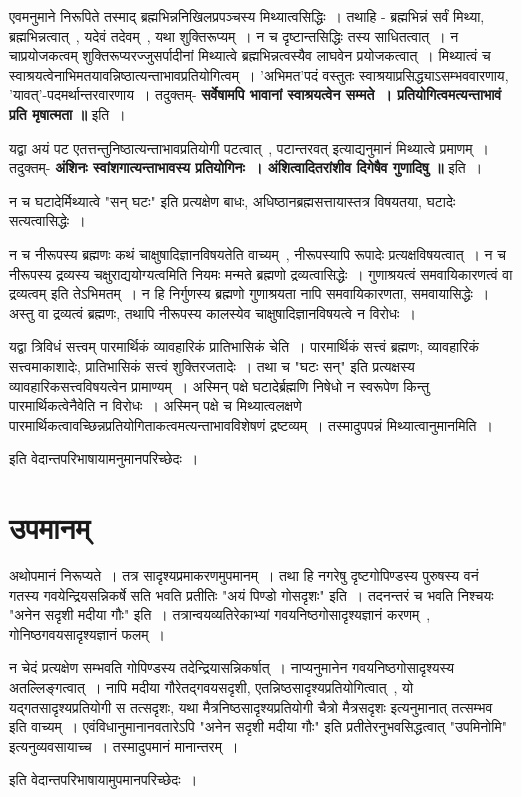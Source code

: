 	एवमनुमाने निरूपिते तस्माद् ब्रह्मभिन्ननिखिलप्रपञ्चस्य मिथ्यात्वसिद्धिः~। तथाहि - ब्रह्मभिन्नं सर्वं मिथ्या, ब्रह्मभिन्नत्वात्~, यदेवं तदेवम्~, यथा शुक्तिरूप्यम्~। न च दृष्टान्तसिद्धिः तस्य साधितत्वात्~। न चाप्रयोजकत्वम् शुक्तिरूप्यरज्जुसर्पादीनां मिथ्यात्वे ब्रह्मभिन्नत्वस्यैव लाघवेन प्रयोजकत्वात्~। मिथ्यात्वं च स्वाश्रयत्वेनाभिमतयावन्निष्ठात्यन्ताभावप्रतियोगित्वम्~। 'अभिमत'पदं वस्तुतः स्वाश्रयाप्रसिद्ध्याऽसम्भववारणाय, 'यावत्'-पदमर्थान्तरवारणाय~। तदुक्तम्- {\bfseries सर्वेषामपि भावानां स्वाश्रयत्वेन सम्मते~। प्रतियोगित्वमत्यन्ताभावं प्रति मृषात्मता ॥} इति~। \par
	यद्वा अयं पट एतत्तन्तुनिष्ठात्यन्ताभावप्रतियोगी पटत्वात्~, पटान्तरवत् इत्याद्यनुमानं मिथ्यात्वे प्रमाणम्~। तदुक्तम्- {\bfseries अंशिनः स्वांशगात्यन्ताभावस्य प्रतियोगिनः~। अंशित्वादितरांशीव दिगेषैव गुणादिषु ॥} इति~।  \par
	न च घटादेर्मिथ्यात्वे "सन् घटः" इति प्रत्यक्षेण बाधः, अधिष्ठानब्रह्मसत्तायास्तत्र विषयतया, घटादेः सत्यत्वासिद्धेः~।\par
	न च नीरूपस्य ब्रह्मणः कथं चाक्षुषादिज्ञानविषयतेति वाच्यम्~, नीरूपस्यापि रूपादेः प्रत्यक्षविषयत्वात्~। न च नीरूपस्य द्रव्यस्य चक्षुराद्ययोग्यत्वमिति नियमः मन्मते ब्रह्मणो द्रव्यत्वासिद्धेः~। गुणाश्रयत्वं समवायिकारणत्वं वा द्रव्यत्वम् इति तेऽभिमतम्~। न हि निर्गुणस्य ब्रह्मणो गुणाश्रयता नापि समवायिकारणता, समवायासिद्धेः~। अस्तु वा द्रव्यत्वं ब्रह्मणः, तथापि नीरूपस्य कालस्येव चाक्षुषादिज्ञानविषयत्वे न विरोधः~।\par
	यद्वा त्रिविधं सत्त्वम् पारमार्थिकं व्यावहारिकं प्रातिभासिकं चेति~। पारमार्थिकं सत्त्वं ब्रह्मणः, व्यावहारिकं सत्त्वमाकाशादेः, प्रातिभासिकं सत्त्वं शुक्तिरजतादेः~। तथा च "घटः सन्" इति प्रत्यक्षस्य व्यावहारिकसत्त्वविषयत्वेन प्रामाण्यम्~। अस्मिन् पक्षे घटादेर्ब्रह्मणि निषेधो न स्वरूपेण किन्तु पारमार्थिकत्वेनैवेति न विरोधः~। अस्मिन् पक्षे च मिथ्यात्वलक्षणे पारमार्थिकत्वावच्छिन्नप्रतियोगिताकत्वमत्यन्ताभावविशेषणं द्रष्टव्यम्~। तस्मादुपपन्नं मिथ्यात्वानुमानमिति~।
	\begin{center} इति वेदान्तपरिभाषायामनुमानपरिच्छेदः~।\end{center} 
\section{उपमानम्}\par
	अथोपमानं निरूप्यते~। तत्र सादृश्यप्रमाकरणमुपमानम्~। तथा हि नगरेषु दृष्टगोपिण्डस्य पुरुषस्य वनं गतस्य गवयेन्द्रियसन्निकर्षे सति भवति प्रतीतिः "अयं पिण्डो गोसदृशः" इति~। तदनन्तरं च भवति निश्चयः "अनेन सदृशी मदीया गौः" इति~। तत्रान्वयव्यतिरेकाभ्यां गवयनिष्ठगोसादृश्यज्ञानं करणम्~, गोनिष्ठगवयसादृश्यज्ञानं फलम्~।\par
	न चेदं प्रत्यक्षेण सम्भवति गोपिण्डस्य तदेन्द्रियासन्निकर्षात्~। नाप्यनुमानेन गवयनिष्ठगोसादृश्यस्य अतल्लिङ्गत्वात्~। नापि मदीया गौरेतद्गवयसदृशी, एतन्निष्ठसादृश्यप्रतियोगित्वात्~, यो यद्गतसादृश्यप्रतियोगी स तत्सदृशः, यथा मैत्रनिष्ठसादृश्यप्रतियोगी चैत्रो मैत्रसदृशः इत्यनुमानात् तत्सम्भव इति वाच्यम्~। एवंविधानुमानानवतारेऽपि "अनेन सदृशी मदीया गौः" इति प्रतीतेरनुभवसिद्धत्वात् "उपमिनोमि" इत्यनुव्यवसायाच्च~। तस्मादुपमानं मानान्तरम्~।\\
	\begin{center} इति वेदान्तपरिभाषायामुपमानपरिच्छेदः~।\end{center} 
